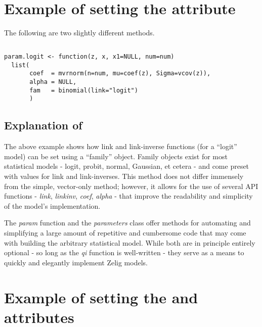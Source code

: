 \documentclass{article}
\begin{document}
\section{Example of setting the  attribute}

The following are two slightly different  methods.

\subsection{}

\begin{verbatim}
param.logit <- function(z, x, x1=NULL, num=num)
  list(
       coef  = mvrnorm(n=num, mu=coef(z), Sigma=vcov(z)),
       alpha = NULL,
       fam   = binomial(link="logit")
       )
\end{verbatim}


\subsection{Explanation of }

The above example shows how link and link-inverse functions (for a ``logit'' model) can be set using a ``family'' object.  Family objects exist for most statistical models - logit, probit, normal, Gaussian, et cetera - and come preset with values for link and link-inverses.  This method does not differ immensely from the simple, vector-only method; however, it allows for the use of several API functions - \emph{link}, \emph{linkinv}, \emph{coef}, \emph{alpha} - that improve the readability and simplicity of the model's implementation.

The \emph{param} function and the \emph{parameters} class offer methods for automating and simplifying a large amount of repetitive and cumbersome code that may come with building the arbitrary statistical model.  While both are in principle entirely optional - so long as the \emph{qi} function is well-written - they serve as a means to quickly and elegantly implement Zelig models.


\section{Example of setting the  and  attributes}

\subsection{}
\end{document}

